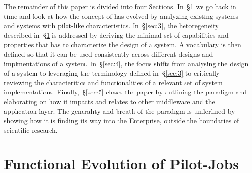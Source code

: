 \documentclass{sig-alternate}
\begin{document}
The remainder of this paper is divided into four Sections.
In~\S\ref{sec:history} we go back in time and look at how the concept of
\pilotjobs has evolved by analyzing existing \pilot systems and systems
with pilot-like characteristics. In~\S\ref{sec:3}, the hetoregeneity
described in~\S\ref{sec:history} is addressed by deriving the minimal
set of capabilities and properties that has to characterize the design
of a \pilot system. A vocabulary is then defined so that it can be used
consistently across different designs and implmentations of a \pilot
system. In~\S\ref{sec:4}, the focus shifts from analysing the design of
a \pilot system to  leveraging the terminology defined in~\S\ref{sec:3}
to critically reviewing the characteritics and functionalities of a
relevant set of \pilot system implementations. Finally,~\S\ref{sec:5}
closes the paper by outlining the \pilot paradigm and elaborating on how
it impacts and relates to other middleware and the application layer.
The generality and breath of the \pilot paradigm is underlined by
showing how it is finding its way into the Enterprise, outside the
boundaries of scientific research.

\section{Functional Evolution of Pilot-Jobs}\label{sec:history}



\end{document}
